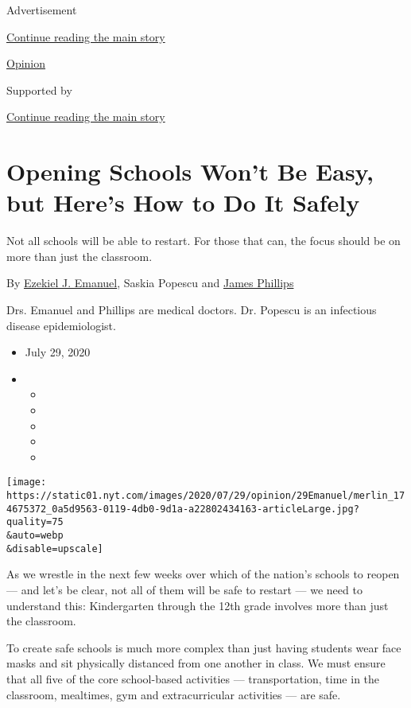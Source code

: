 Advertisement

\protect\hyperlink{after-top}{Continue reading the main story}

\href{/section/opinion}{Opinion}

Supported by

\protect\hyperlink{after-sponsor}{Continue reading the main story}

\hypertarget{opening-schools-wont-be-easy-but-heres-how-to-do-it-safely}{%
\section{Opening Schools Won't Be Easy, but Here's How to Do It
Safely}\label{opening-schools-wont-be-easy-but-heres-how-to-do-it-safely}}

Not all schools will be able to restart. For those that can, the focus
should be on more than just the classroom.

By \href{https://hcmg.wharton.upenn.edu/profile/zemanuel/}{Ezekiel J.
Emanuel}, Saskia Popescu and
\href{https://smhs.gwu.edu/emed/education-training/fellowships/ems-disaster}{James
Phillips}

Drs. Emanuel and Phillips are medical doctors. Dr. Popescu is an
infectious disease epidemiologist.

\begin{itemize}
\item
  July 29, 2020
\item
  \begin{itemize}
  \item
  \item
  \item
  \item
  \item
  \end{itemize}
\end{itemize}

\texttt{[image: https://static01.nyt.com/images/2020/07/29/opinion/29Emanuel/merlin\_174675372\_0a5d9563-0119-4db0-9d1a-a22802434163-articleLarge.jpg?quality=75\\\&auto=webp\\\&disable=upscale]}

As we wrestle in the next few weeks over which of the nation's schools
to reopen --- and let's be clear, not all of them will be safe to
restart --- we need to understand this: Kindergarten through the 12th
grade involves more than just the classroom.

To create safe schools is much more complex than just having students
wear face masks and sit physically distanced from one another in class.
We must ensure that all five of the core school-based activities ---
transportation, time in the classroom, mealtimes, gym and
extracurricular activities --- are safe.

